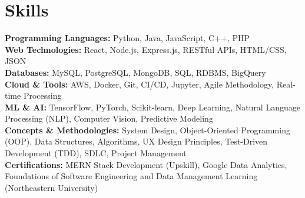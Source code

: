 \documentclass[a4paper,10pt]{article}
\begin{document}
\section*{Skills}
\textbf{Programming Languages:} Python, Java, JavaScript, C++, PHP \\
\textbf{Web Technologies:} React, Node.js, Express.js, RESTful APIs, HTML/CSS, JSON \\
\textbf{Databases:} MySQL, PostgreSQL, MongoDB, SQL, RDBMS, BigQuery \\
\textbf{Cloud \& Tools:} AWS, Docker, Git, CI/CD, Jupyter, Agile Methodology, Real-time Processing \\
\textbf{ML & AI:} TensorFlow, PyTorch, Scikit-learn, Deep Learning, Natural Language Processing (NLP), Computer Vision, Predictive Modeling \\
\textbf{Concepts \& Methodologies:} System Design, Object-Oriented Programming (OOP), Data Structures, Algorithms, UX Design Principles, Test-Driven Development (TDD), SDLC, Project Management \\
\textbf{Certifications:} MERN Stack Development (Upskill), Google Data Analytics, Foundations of Software Engineering and Data Management Learning (Northeastern University) \\

\vspace{-4mm}
\end{document}
